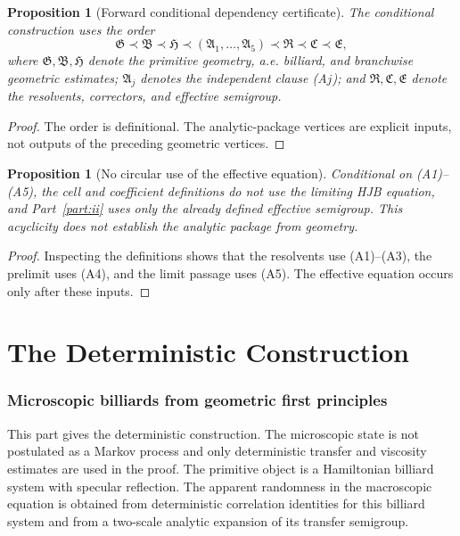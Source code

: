 \documentclass[12pt, letterpaper]{amsart}
\theoremstyle{plain}
\newtheorem{proposition}[theorem]{Proposition}
\theoremstyle{definition}
\theoremstyle{remark}
\begin{document}
\begin{proposition}[Forward conditional dependency certificate]
\label{thm:forward_dependency_certificate}
The conditional construction uses the order
\begin{equation}
\label{eq:forward_dependency_certificate}
\mathfrak G\prec\mathfrak B\prec\mathfrak H\prec
(\mathfrak A_{1},\ldots,\mathfrak A_{5})\prec
\mathfrak R\prec\mathfrak C\prec\mathfrak E,
\end{equation}
where $\mathfrak G,\mathfrak B,\mathfrak H$ denote the primitive geometry,
a.e. billiard, and branchwise geometric estimates; $\mathfrak A_j$ denotes
the independent clause \textup{(A$j$)}; and $\mathfrak R,\mathfrak C,
\mathfrak E$ denote the resolvents, correctors, and effective semigroup.
\end{proposition}

\begin{proof}
The order is definitional. The analytic-package vertices are explicit inputs,
not outputs of the preceding geometric vertices.
\end{proof}

\begin{proposition}[No circular use of the effective equation]
\label{thm:no_hidden_assumption_principle_strengthened}
Conditional on \textup{(A1)--(A5)}, the cell and coefficient definitions do
not use the limiting HJB equation, and Part~\ref{part:ii} uses only the
already defined effective semigroup. This acyclicity does not establish the
analytic package from geometry.
\end{proposition}

\begin{proof}
Inspecting the definitions shows that the resolvents use \textup{(A1)--(A3)},
the prelimit uses \textup{(A4)}, and the limit passage uses \textup{(A5)}.
The effective equation occurs only after these inputs.
\end{proof}


\part{The Deterministic Construction}
\label{part:i}

\section{Microscopic billiards from geometric first principles}
\label{sec:micro_framework}

This part gives the deterministic construction.  The microscopic state is not postulated as a Markov process and only deterministic transfer and viscosity estimates are used in the proof.  The primitive object is a Hamiltonian billiard system with specular reflection.  The apparent randomness in the macroscopic equation is obtained from deterministic correlation identities for this billiard system and from a two-scale analytic expansion of its transfer semigroup.
\end{document}
